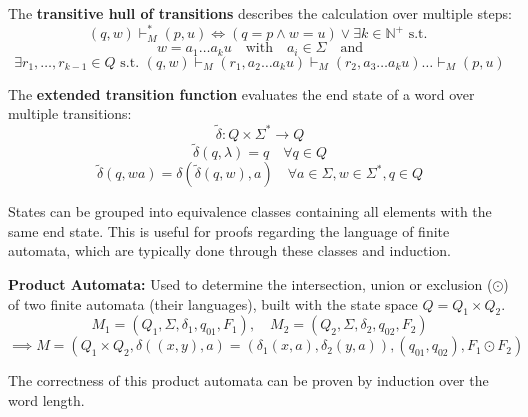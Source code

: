 \begin{definition}
    The \textbf{transitive hull of transitions} describes the calculation over
    multiple steps:
    $$
        (q,w) \vdash_{M}^{*} (p,u)
              \iff           (q = p \land w = u) \lor \exists k
              \in            \mathbb{N}^{+} \text{ s.t. }
    $$
    $$
        w =   a_1 \dots a_k u \quad \text{with} \quad a_i
          \in \Sigma \quad \text{and}
    $$
    $$
        \exists r_1, \dots, r_{k-1} \in        Q \text{ s.t. } (q,w)
                                    \vdash_{M} (r_1, a_2 \dots a_k u)
                                    \vdash_{M} (r_2, a_3 \dots a_k u) \dots
                                    \vdash_{M} (p,u)
    $$
\end{definition}

\begin{definition}
    The \textbf{extended transition function} evaluates the end state of a word
    over multiple transitions:
    $$
        \tilde{\delta}: Q \times \Sigma^{*} \to Q
    $$
    $$
        \tilde{\delta}(q, \lambda) = q \quad \forall q \in Q
    $$
    $$
        \tilde{\delta}(q, wa)
        =   \delta(\tilde{\delta} (q,w), a) \quad \forall a
        \in \Sigma, w
        \in \Sigma^{*}, q
        \in Q
    $$
\end{definition}

\begin{remark}
    States can be grouped into equivalence classes containing all elements with
    the same end state. This is useful for proofs regarding the language of
    finite automata, which are typically done through these classes and
    induction.
\end{remark}

\begin{definition}
    \textbf{Product Automata:} Used to determine the intersection, union or
    exclusion ($\odot$) of two finite automata (their languages), built with the
    state space $Q = Q_1 \times Q_2$.
    $$
        M_1 = (Q_1, \Sigma, \delta_1, q_{01}, F_1), \quad M_2
            = (Q_2, \Sigma, \delta_2, q_{02}, F_2)
    $$
    $$
        \implies M
        =        (Q_1 \times Q_2, \delta((x,y), a) = (\delta_1(x, a), \delta_2(y, a)), (q_01, q_02), F_1 \odot F_2)
    $$
\end{definition}

\begin{remark}
    The correctness of this product automata can be proven by induction over the
    word length.
\end{remark}

